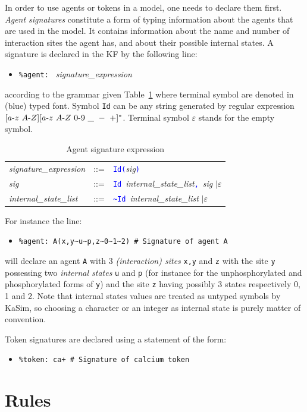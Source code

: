 \documentclass[11pt]{book}
\def\KaSim{\textsf{KaSim}}
\def\sep{\hbox{-}}
\def\int{\hbox{\texttt{\~}}}
\def\tcb#1{\textcolor{blue}{\ttt{#1}}}
\def\ttt#1{\texttt{#1}}
\def\ITE#1{\begin{itemize}#1\end{itemize}}
\begin{document}
In order to use agents or tokens in a model, one needs to declare them first. \emph{Agent signatures} constitute a form of typing information about the agents that are used in the model. It contains information about the name and number of interaction sites the agent has, and about their possible internal states. A signature is declared in the KF by the following line:
\ITE{
\item[] \ttt{\%agent: } \textit{signature\_expression}
}
according to the grammar given Table~\ref{tab:sig} where terminal symbol are denoted in (blue) typed font. Symbol \ttt{Id} can be any string generated by regular expression $[a\sep z\ A\sep Z][a\sep z\ A \sep Z\ 0\sep 9\ \_ \ -\ +]^*$. Terminal symbol $\varepsilon$ stands for the empty symbol.
\begin{table}[htbp]
  \centering
  \caption{Agent signature expression}
  \begin{tabular}{@{} lcl @{}}
    \textit{signature\_expression} & ::= & \tcb{Id}\tcb{(}\textit{sig}\tcb{)} \\ 
    \textit{sig} & ::= & \tcb{Id}~\textit{internal\_state\_list}\tcb{,}\ \textit{sig} $\mid\varepsilon$ \\ 
    \textit{internal\_state\_list} & ::= & \tcb{\int Id}~\textit{internal\_state\_list} $\mid\varepsilon$
    \end{tabular}
  \label{tab:sig}
\end{table}

For instance the line:
\ITE{
\item[] \ttt{\%agent: A(x,y\int u\int p,z\int 0\int 1\int 2) \# Signature of agent A} 
}
will declare an agent \ttt{A} with 3 \emph{(interaction) sites} \ttt{x,y} and \ttt{z} with the site \ttt{y} possessing two \emph{internal states} \ttt{u} and \ttt{p} (for instance for the unphosphorylated and phosphorylated forms of \ttt{y}) and the site \ttt{z} having possibly 3 states respectively 0, 1 and 2. Note that internal states values are treated as untyped symbols by \KaSim, so choosing a character or an integer as internal state is purely matter of convention. 

Token signatures are declared using a statement of the form:
\ITE{
\item[] \ttt{\%token: ca+ \# Signature of calcium token} 
}

\section{Rules}\label{sec:rules}
\end{document}
